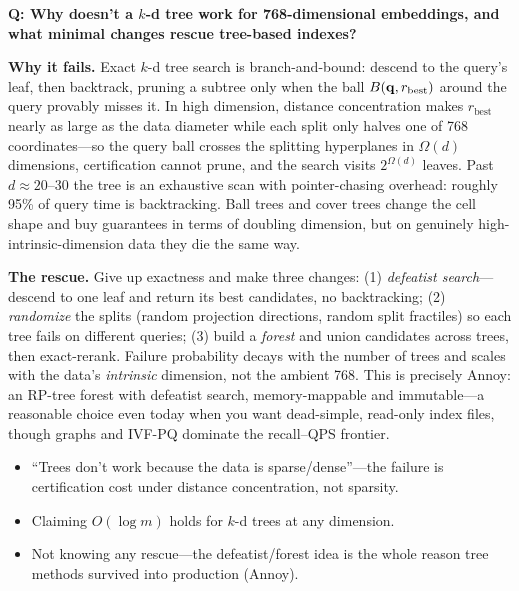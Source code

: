 \begin{interviewq}
\textbf{Q: Why doesn't a $k$-d tree work for 768-dimensional embeddings, and what minimal changes rescue tree-based indexes?}

 \quad {} \quad \badgefreq{\freqmed}

\stronganswer

\textbf{Why it fails.} Exact $k$-d tree search is branch-and-bound: descend to the query's leaf, then backtrack, pruning a subtree only when the ball $B(\mathbf{q}, r_{\text{best}})$ around the query provably misses it. In high dimension, distance concentration makes $r_{\text{best}}$ nearly as large as the data diameter while each split only halves one of 768 coordinates---so the query ball crosses the splitting hyperplanes in $\Omega(d)$ dimensions, certification cannot prune, and the search visits $2^{\Omega(d)}$ leaves. Past $d \approx 20$--$30$ the tree is an exhaustive scan with pointer-chasing overhead: roughly 95\% of query time is backtracking. Ball trees and cover trees change the cell shape and buy guarantees in terms of doubling dimension, but on genuinely high-intrinsic-dimension data they die the same way.

\textbf{The rescue.} Give up exactness and make three changes: (1) \emph{defeatist search}---descend to one leaf and return its best candidates, no backtracking; (2) \emph{randomize} the splits (random projection directions, random split fractiles) so each tree fails on different queries; (3) build a \emph{forest} and union candidates across trees, then exact-rerank. Failure probability decays with the number of trees and scales with the data's \emph{intrinsic} dimension, not the ambient 768. This is precisely Annoy: an RP-tree forest with defeatist search, memory-mappable and immutable---a reasonable choice even today when you want dead-simple, read-only index files, though graphs and IVF-PQ dominate the recall--QPS frontier.

\redflags
\begin{itemize}
    \item ``Trees don't work because the data is sparse/dense''---the failure is certification cost under distance concentration, not sparsity.
    \item Claiming $O(\log m)$ holds for $k$-d trees at any dimension.
    \item Not knowing any rescue---the defeatist/forest idea is the whole reason tree methods survived into production (Annoy).
\end{itemize}


\end{interviewq}
